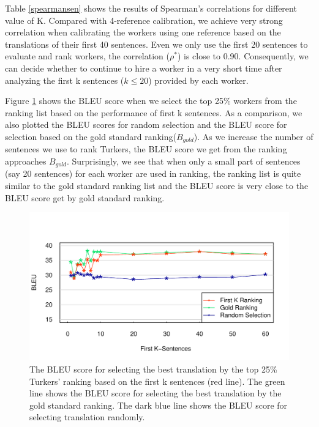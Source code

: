 \documentclass[11pt,letterpaper]{article}
\begin{document}
Table \ref{spearmansen} shows the results of Spearman's correlations for different value of K. Compared with 4-reference calibration, we achieve very strong correlation when calibrating the workers using one reference based on  the translations of their first 40 sentences. Even we only use the first 20 sentences to evaluate and rank workers, the correlation ($\rho^{*}$) is close to 0.90. Consequently, we can decide whether to continue to hire a worker in a very short time after analyzing the first k sentences ($k\le20$) provided by each worker. 

Figure \ref{firstksenbleu}  shows the BLEU score when we select the top 25\% workers from the ranking list based on the performance of first k sentences.
  As a comparison, we also plotted the  BLEU scores for random selection 
  and the BLEU score for selection based on the gold standard ranking($B_{gold}$).
  As we increase the number of sentences we use to rank Turkers, the BLEU score we get from the ranking approaches $B_{gold}$. Surprisingly, we see that when only a small part of sentences (say 20 sentences) for each worker are used in ranking, the ranking list  is quite similar to the gold standard ranking list and the BLEU score is very close to the BLEU score get by gold standard ranking.
\begin{figure}[h!]
  \centering
  \includegraphics[width=\linewidth]{senlevelselect/curve1.pdf}
  \caption{ The BLEU score for selecting the  best translation by the top 25\% Turkers' ranking based on the first k sentences (red line). The green line shows the BLEU score for selecting the best translation by the gold standard ranking. The dark blue line shows the BLEU score for selecting translation randomly.}
    \label{firstksenbleu}
\end{figure}
%
\end{document}
